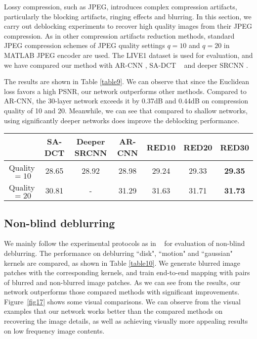Lossy compression, such as JPEG, introduces complex compression artifacts,
particularly the blocking artifacts, ringing effects and blurring. In this
section, we carry out deblocking experiments to recover high quality images
from their JPEG compression. As in other compression artifacts reduction methods,
standard JPEG compression schemes of JPEG quality settings $q = 10$ and $q = 20$ in
MATLAB JPEG encoder are used. The LIVE1 dataset is used for evaluation, and we
have compared our method with AR-CNN \cite{DBLP:conf/iccv/DongDLT15}, SA-DCT
~\cite{DBLP:journals/tip/FoiKE07} and deeper SRCNN \cite{DBLP:conf/iccv/DongDLT15}.

The results are shown in Table \ref{table9}. We can observe that since the
Euclidean loss favors a high PSNR, our network outperforms other methods.
Compared to AR-CNN, the 30-layer network exceeds it by 0.37dB and 0.44dB on
compression quality of 10 and 20. Meanwhile, we can see that compared to
shallow networks, using significantly deeper networks does improve the deblocking performance.

\begin{table*}[htb!]
\centering
%
\caption{JPEG compression deblock: average PSNR results of LIVE1.}
\begin{tabular}{c|c c c c c c} \hline
              &SA-DCT   &Deeper SRCNN   &AR-CNN   &RED10   &RED20  &RED30           \\ \hline
  Quality $=10$  &28.65  	&28.92          &28.98    &29.24   &29.33  &\textbf{29.35}  \\ \hline
  Quality $=20$  &30.81  	&-              &31.29    &31.63   &31.71  &\textbf{31.73}  \\ \hline
\end{tabular}
\label{table9}
\end{table*}



\subsection{Non-blind deblurring}

We mainly follow the experimental protocols as in ~\cite{DBLP:conf/nips/XuRLJ14} for
evaluation of non-blind deblurring. The performance on deblurring ``disk", ``motion"
and ``gaussian" kernels are compared, as shown in Table \ref{table10}. We generate
blurred image patches with the corresponding kernels, and train end-to-end
mapping with pairs of blurred and non-blurred image patches. As we can see from the results,
our network outperforms those compared methods with significant improvements. Figure~\ref{fig17} shows some visual comparisons.
We can observe from the visual examples
that our network works better than the compared methods on recovering the image details,
as well as achieving visually more appealing results on low frequency image contents.


